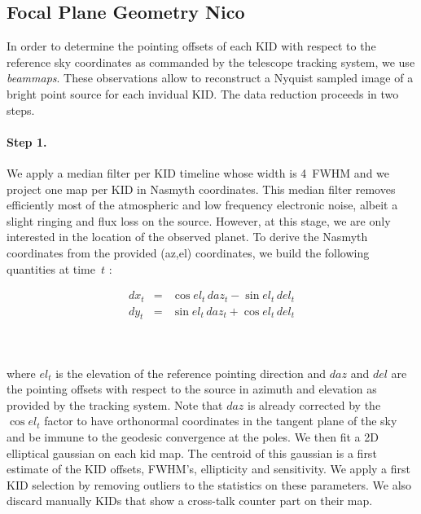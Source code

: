 %
%
%


\subsection{Focal Plane Geometry {\color{blue} Nico}}

In order to determine the pointing offsets of each KID with respect to the reference sky
coordinates as commanded by the telescope tracking system, we use {\it
  beammaps}. These observations allow to reconstruct a Nyquist sampled image of
a bright point source for each invidual KID. The data reduction proceeds in two steps.

\paragraph{Step 1.} We apply a median filter per
KID timeline whose width is 4~FWHM and we project one map per KID in Nasmyth
coordinates. This median filter removes efficiently most of the atmospheric and low frequency
electronic noise, albeit a slight ringing and flux loss on the
source. However, at this stage, we are only interested in the location of the
observed planet. To derive the Nasmyth coordinates from the provided (az,el)
coordinates, we build the following quantities at time~$t$ :

\begin{eqnarray}
dx_t &=& \cos el_t\, daz_t - \sin el_t\, del_t \nonumber \\
dy_t &=& \sin el_t\, daz_t + \cos el_t\, del_t \nonumber
\end{eqnarray}

\\
\\

where $el_t$ is the elevation of the reference pointing direction and $daz$ and
$del$ are the pointing offsets with respect to the source in azimuth and elevation as
provided by the tracking system. Note that $daz$ is already corrected by the
$\cos el_t$ factor to have orthonormal coordinates in the tangent plane of the sky
and be immune to the geodesic convergence at the poles. We then fit a 2D
elliptical gaussian on each kid map. The centroid of this gaussian is a first
estimate of the KID offsets, FWHM's, ellipticity and sensitivity. We apply a
first KID selection by removing outliers to the statistics on these
parameters. We also discard manually KIDs that show a cross-talk counter part on
their map. 

